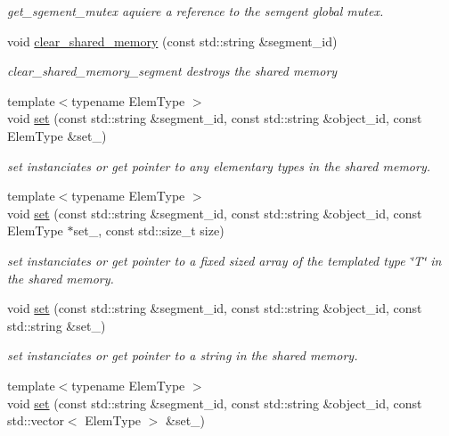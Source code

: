 \begin{DoxyCompactItemize}
\begin{DoxyCompactList}\small\item\em get\+\_\+sgement\+\_\+mutex aquiere a reference to the semgent global mutex. \end{DoxyCompactList}\item 
void \hyperlink{namespaceshared__memory_aa8583540879db53fc80b31410b5eec68}{clear\+\_\+shared\+\_\+memory} (const std\+::string \&segment\+\_\+id)
\begin{DoxyCompactList}\small\item\em clear\+\_\+shared\+\_\+memory\+\_\+segment destroys the shared memory \end{DoxyCompactList}\item 
{\footnotesize template$<$typename Elem\+Type $>$ }\\void \hyperlink{namespaceshared__memory_ace68bf582cfe50ba83a9cfc9b7aed3b2}{set} (const std\+::string \&segment\+\_\+id, const std\+::string \&object\+\_\+id, const Elem\+Type \&set\+\_\+)
\begin{DoxyCompactList}\small\item\em set instanciates or get pointer to any elementary types in the shared memory. \end{DoxyCompactList}\item 
{\footnotesize template$<$typename Elem\+Type $>$ }\\void \hyperlink{namespaceshared__memory_a7e37a0a2146d2cfeeccb63390a3d9132}{set} (const std\+::string \&segment\+\_\+id, const std\+::string \&object\+\_\+id, const Elem\+Type $\ast$set\+\_\+, const std\+::size\+\_\+t size)
\begin{DoxyCompactList}\small\item\em set instanciates or get pointer to a fixed sized array of the templated type \char`\"{}\+T\char`\"{} in the shared memory. \end{DoxyCompactList}\item 
void \hyperlink{namespaceshared__memory_a61a2945c994bcbe84cc8dce96a189edb}{set} (const std\+::string \&segment\+\_\+id, const std\+::string \&object\+\_\+id, const std\+::string \&set\+\_\+)
\begin{DoxyCompactList}\small\item\em set instanciates or get pointer to a string in the shared memory. \end{DoxyCompactList}\item 
{\footnotesize template$<$typename Elem\+Type $>$ }\\void \hyperlink{namespaceshared__memory_ac6521a6731fa97be21779b1d6c7589ee}{set} (const std\+::string \&segment\+\_\+id, const std\+::string \&object\+\_\+id, const std\+::vector$<$ Elem\+Type $>$ \&set\+\_\+)

\end{DoxyCompactItemize}
